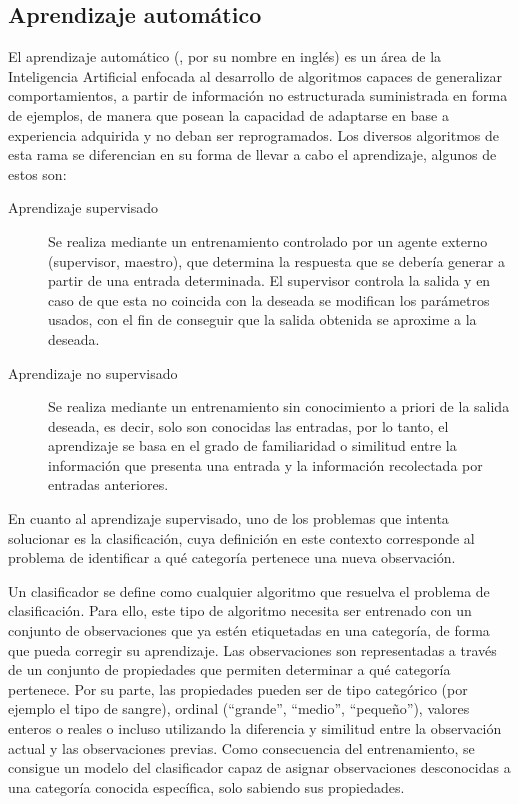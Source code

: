 \subsection{Aprendizaje automático}
El aprendizaje automático (, por su nombre en inglés) es un área de la Inteligencia Artificial enfocada al desarrollo de algoritmos capaces de generalizar comportamientos, a partir de información no estructurada suministrada en forma de ejemplos, de manera que posean la capacidad de adaptarse en base a experiencia adquirida y no deban ser reprogramados. Los diversos algoritmos de esta rama se diferencian en su forma de llevar a cabo el aprendizaje, algunos de estos son:

\begin{description}
\item [Aprendizaje supervisado] Se realiza mediante un entrenamiento controlado por un agente externo (supervisor, maestro), que determina la respuesta que se debería generar a partir de una entrada determinada. El supervisor controla la salida y en caso de que esta no coincida con la deseada se modifican los parámetros usados, con el fin de conseguir que la salida obtenida se aproxime a la deseada.

\item [Aprendizaje no supervisado] Se realiza mediante un entrenamiento sin conocimiento a priori de la salida deseada, es decir, solo son conocidas las entradas, por lo tanto, el aprendizaje se basa en el grado de familiaridad o similitud entre la información que presenta una entrada y la información recolectada por entradas anteriores.
\end{description}

En cuanto al aprendizaje supervisado, uno de los problemas que intenta solucionar es la clasificación, cuya definición en este contexto corresponde al problema de identificar a qué categoría pertenece una nueva observación. 

Un clasificador se define como cualquier algoritmo que resuelva el problema de clasificación. Para ello, este tipo de algoritmo necesita ser entrenado con un conjunto de observaciones que ya estén etiquetadas en una categoría, de forma que pueda corregir su aprendizaje. Las observaciones son representadas a través de un conjunto de propiedades que permiten determinar a qué categoría pertenece. Por su parte, las propiedades pueden ser de tipo categórico (por ejemplo el tipo de sangre), ordinal (“grande”, “medio”, “pequeño”), valores enteros o reales o incluso utilizando la diferencia y similitud entre la observación actual y las observaciones previas. Como consecuencia del entrenamiento, se consigue un modelo del clasificador capaz de asignar observaciones desconocidas a una categoría conocida específica, solo sabiendo sus propiedades.

